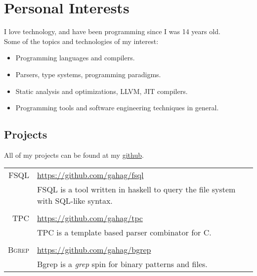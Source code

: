 \documentclass[a4paper,10pt]{article}
\newcommand{\cpp}{C\protect\scalebox{0.8}{\protect\raisebox{0.4ex}{++}}}
\renewcommand\#{\protect\scalebox{0.8}{\protect\raisebox{0.4ex}{\char"0023}}}
\begin{document}
\section{Personal Interests}
I love technology, and have been programming since I was 14 years old. \\
Some of the topics and technologies of my interest:
\vspace{-3pt}
\begin{itemize}
  \setlength\itemsep{-3pt}
  \item Programming languages and compilers.
  \item Parsers, type systems, programming paradigms.
  \item Static analysis and optimizations, LLVM, JIT compilers.
  \item Programming tools and software engineering techniques in general.
\end{itemize}

\subsection{Projects}
All of my projects can be found at my \href{https://github.com/gahag/}{github}. \\[10pt]
\begin{tabular}{r|l}
  \textsc{FSQL} & \url{https://github.com/gahag/fsql} \\[3pt]
  & FSQL is a tool written in haskell to query the file system with SQL-like syntax. \\
  
  \multicolumn{2}{c}{} \\
  \textsc{TPC} & \url{https://github.com/gahag/tpc} \\[3pt]
  & TPC is a template based parser combinator for \cpp. \\

  \multicolumn{2}{c}{} \\
  \textsc{Bgrep} & \url{https://github.com/gahag/bgrep} \\[3pt]
  & Bgrep is a \textit{grep} spin for binary patterns and files. \\
\end{tabular}
\end{document}

